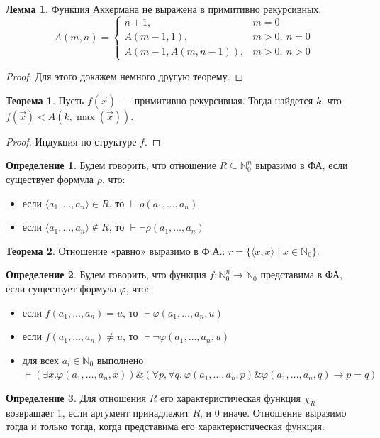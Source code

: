 \documentclass[a4paper,11pt]{article}
\theoremstyle{definition}
\newtheorem*{thm}{Теорема}
\newtheorem*{lmm}{Лемма}
\newtheorem*{dfn}{Определение}
\newcommand{\proves}{\vdash}
\newcommand{\amp}{\mathbin{\&}}
\begin{document}
\begin{lmm}
Функция Аккермана не выражена в примитивно рекурсивных.
\[
A(m, n) =
\begin{cases}
n + 1, & m = 0\\
A(m-1, 1), & m > 0,\ n = 0\\
A(m-1, A(m, n-1)), & m > 0,\ n > 0
\end{cases}
\]
\end{lmm}
\begin{proof}
Для этого докажем немного другую теорему.
\end{proof}
\begin{thm}
Пусть $f(\vec x)$~--- примитивно рекурсивная. Тогда найдется $k$, что $f(\vec x)
< A(k, \max(\vec x))$.
\end{thm}
\begin{proof}
Индукция по структуре $f$.
\end{proof}

\begin{dfn}
Будем говорить, что отношение $R \subseteq \mathbb{N}_0^n$ выразимо в ФА, если
существует формула $\rho$, что:
\begin{itemize}
\item если $\langle a_1, \dots, a_n\rangle \in R$, то $\proves \rho(a_1, \dots,
  a_n)$
\item если $\langle a_1, \dots, a_n\rangle \notin R$, то $\proves \neg\rho(a_1,
  \dots, a_n)$
\end{itemize}
\end{dfn}
\begin{thm}
Отношение «равно» выразимо в Ф.А.: $r = \{\langle x, x\rangle \mid x \in
\mathbb{N}_0\}$.
\end{thm}
\begin{dfn}
Будем говорить, что функция $f : \mathbb{N}_0^n \to \mathbb{N}_0$ представима в
ФА, если существует формула $\varphi$, что:
\begin{itemize}
\item если $f(a_1, \dots, a_n) = u$, то $\proves \varphi(a_1, \dots, a_n, u)$
\item если $f(a_1, \dots, a_n) \ne u$, то $\proves \neg\varphi(a_1, \dots, a_n,
  u)$
\item для всех $a_i \in \mathbb{N}_0$ выполнено $\proves (\exists
  x.\varphi(a_1, \dots, a_n, x)) \amp (\forall p, \forall q.\ \varphi(a_1,
  \dots, a_n, p) \amp \varphi(a_1, \dots, a_n, q) \to p = q)$
\end{itemize}
\end{dfn}
\begin{dfn}
Для отношения $R$ его характеристическая функция $\chi_R$ возвращает 1, если
аргумент принадлежит $R$, и 0 иначе. Отношение выразимо тогда и только тогда,
когда представима его характеристическая функция.
\end{dfn}
\end{document}
